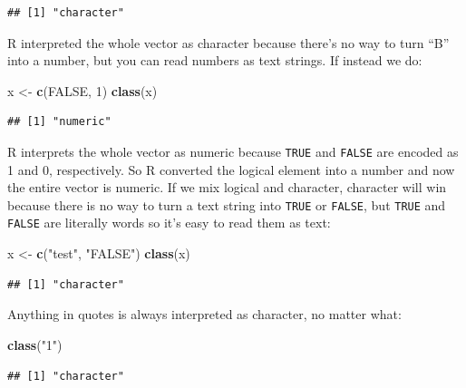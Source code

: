 \documentclass[
]{book}
\newenvironment{Shaded}{\begin{snugshade}}{\end{snugshade}}
\newcommand{\ConstantTok}[1]{\textcolor[rgb]{0.56,0.35,0.01}{#1}}
\newcommand{\DecValTok}[1]{\textcolor[rgb]{0.00,0.00,0.81}{#1}}
\newcommand{\FunctionTok}[1]{\textcolor[rgb]{0.13,0.29,0.53}{\textbf{#1}}}
\newcommand{\NormalTok}[1]{#1}
\newcommand{\OtherTok}[1]{\textcolor[rgb]{0.56,0.35,0.01}{#1}}
\newcommand{\StringTok}[1]{\textcolor[rgb]{0.31,0.60,0.02}{#1}}
\begin{document}
\begin{verbatim}
## [1] "character"
\end{verbatim}

R interpreted the whole vector as character because there's no way to turn ``B''
into a number, but you can read numbers as text strings. If instead we do:

\begin{Shaded}
\begin{Highlighting}[]
\NormalTok{x }\OtherTok{\textless{}{-}} \FunctionTok{c}\NormalTok{(}\ConstantTok{FALSE}\NormalTok{, }\DecValTok{1}\NormalTok{)}
\FunctionTok{class}\NormalTok{(x)}
\end{Highlighting}
\end{Shaded}

\begin{verbatim}
## [1] "numeric"
\end{verbatim}

R interprets the whole vector as numeric because \texttt{TRUE} and \texttt{FALSE} are encoded
as 1 and 0, respectively. So R converted the logical element into a number and
now the entire vector is numeric. If we mix logical and character, character
will win because there is no way to turn a text string into \texttt{TRUE} or \texttt{FALSE},
but \texttt{TRUE} and \texttt{FALSE} are literally words so it's easy to read them as text:

\begin{Shaded}
\begin{Highlighting}[]
\NormalTok{x }\OtherTok{\textless{}{-}} \FunctionTok{c}\NormalTok{(}\StringTok{"test"}\NormalTok{, }\StringTok{"FALSE"}\NormalTok{)}
\FunctionTok{class}\NormalTok{(x)}
\end{Highlighting}
\end{Shaded}

\begin{verbatim}
## [1] "character"
\end{verbatim}

Anything in quotes is always interpreted as character, no matter what:

\begin{Shaded}
\begin{Highlighting}[]
\FunctionTok{class}\NormalTok{(}\StringTok{"1"}\NormalTok{)}
\end{Highlighting}
\end{Shaded}

\begin{verbatim}
## [1] "character"
\end{verbatim}
\end{document}

